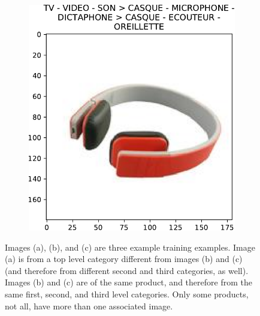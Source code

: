 \begin{figure}
\begin{subfigure}[t]{0.33\columnwidth}
        \caption{}
    \end{subfigure}%
    ~ 
    \begin{subfigure}[t]{0.33\columnwidth}
        \centering
        \includegraphics[width=\textwidth]{img/img-12-1}
        \caption{}
    \end{subfigure}
	\caption{
Images (a), (b), and (c) are three example training examples.
Image (a) is from a top level category different from images (b) and (c) (and therefore from different second and third categories, as well).
Images (b) and (c) are of the same product, and therefore from the same first, second, and third level categories.
Only some products, not all, have more than one associated image.
}
	\label{fig:example-images}
\end{figure}